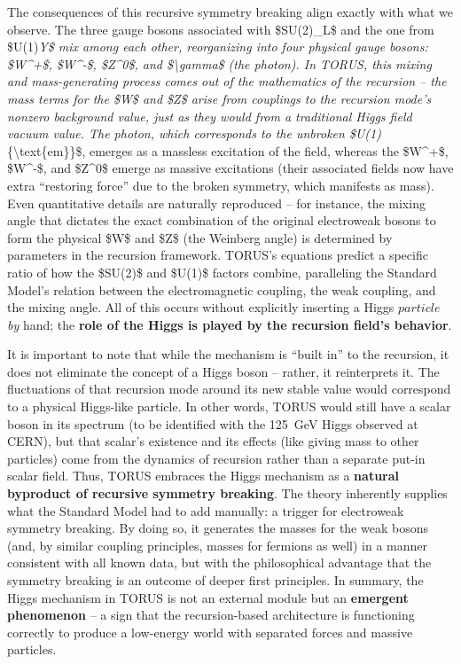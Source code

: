 \documentclass[
]{article}
\begin{document}
{The consequences of this recursive symmetry breaking align exactly with
what we observe. The three gauge bosons associated with \$SU(2)\_L\$ and
the one from \$U(1)\emph{Y\$ mix among each other, reorganizing into
four physical gauge bosons: \$W\^{}+\$, \$W\^{}-\$, \$Z\^{}0\$, and
\$\textbackslash gamma\$ (the photon)\hspace{0pt}. In TORUS, this mixing
and mass-generating process comes out of the mathematics of the
recursion -- the mass terms for the \$W\$ and \$Z\$ arise from couplings
to the recursion mode's nonzero background value, just as they would
from a traditional Higgs field vacuum value. The photon, which
corresponds to the unbroken \$U(1)}\{\textbackslash text\{em\}\}\$,
emerges as a massless excitation of the field, whereas the \$W\^{}+\$,
\$W\^{}-\$, and \$Z\^{}0\$ emerge as massive excitations (their
associated fields now have extra ``restoring force'' due to the broken
symmetry, which manifests as mass)\hspace{0pt}. Even quantitative
details are naturally reproduced -- for instance, the mixing angle that
dictates the exact combination of the original electroweak bosons to
form the physical \$W\$ and \$Z\$ (the Weinberg angle) is determined by
parameters in the recursion framework\hspace{0pt}. TORUS's equations
predict a specific ratio of how the \$SU(2)\$ and \$U(1)\$ factors
combine, paralleling the Standard Model's relation between the
electromagnetic coupling, the weak coupling, and the mixing
angle\hspace{0pt}. All of this occurs without explicitly inserting a
Higgs \emph{$particle$ by} hand; the \textbf{role of the Higgs is played
by the recursion field's behavior}.

It is important to note that while the mechanism is ``built in'' to the
recursion, it does not eliminate the concept of a Higgs boson -- rather,
it reinterprets it. The fluctuations of that recursion mode around its
new stable value would correspond to a physical Higgs-like particle. In
other words, TORUS would still have a scalar boson in its spectrum (to
be identified with the 125~GeV Higgs observed at CERN), but that
scalar's existence and its effects (like giving mass to other particles)
come from the dynamics of recursion rather than a separate put-in scalar
field. Thus, TORUS embraces the Higgs mechanism as a \textbf{natural
byproduct of recursive symmetry breaking}\hspace{0pt}. The theory
inherently supplies what the Standard Model had to add manually: a
trigger for electroweak symmetry breaking. By doing so, it generates the
masses for the weak bosons (and, by similar coupling principles, masses
for fermions as well) in a manner consistent with all known data, but
with the philosophical advantage that the symmetry breaking is an
outcome of deeper first principles. In summary, the Higgs mechanism in
TORUS is not an external module but an \textbf{emergent phenomenon} -- a
sign that the recursion-based architecture is functioning correctly to
produce a low-energy world with separated forces and massive particles.

}
\end{document}
